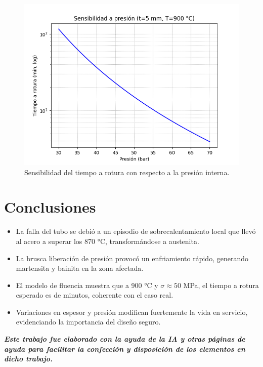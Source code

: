 \documentclass[12pt,a4paper]{article}
\begin{document}
\begin{figure}[H]
    \centering
    \includegraphics[width=0.7\linewidth]{sens_presion.png}
    \caption{Sensibilidad del tiempo a rotura con respecto a la presión interna.}
\end{figure}

\section{Conclusiones}
\begin{itemize}
    \item La falla del tubo se debió a un episodio de sobrecalentamiento local que llevó al acero a superar los 870 °C, transformándose a austenita.
    \item La brusca liberación de presión provocó un enfriamiento rápido, generando martensita y bainita en la zona afectada.
    \item El modelo de fluencia muestra que a 900 °C y $\sigma \approx 50$ MPa, el tiempo a rotura esperado es de minutos, coherente con el caso real.
    \item Variaciones en espesor y presión modifican fuertemente la vida en servicio, evidenciando la importancia del diseño seguro.
\end{itemize}

\vfill
\textit{\textbf{Este trabajo fue elaborado con la ayuda de la IA y otras páginas de ayuda para facilitar la confección y disposición de los elementos en dicho trabajo.}}
\end{document}
